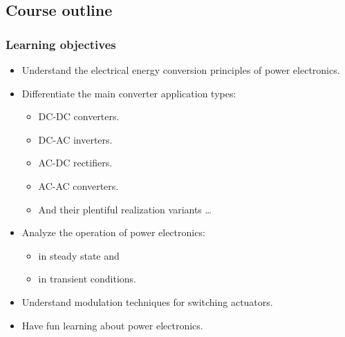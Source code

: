 \subsection{Course outline}

\begin{frame}
	\frametitle{Learning objectives}
	\begin{itemize}
		\item Understand the electrical energy conversion principles of power electronics.
		\item<2-> Differentiate the main converter application types:
		\begin{itemize}
			\item DC-DC converters.
			\item DC-AC inverters.
			\item AC-DC rectifiers.
			\item AC-AC converters.
			\item And their plentiful realization variants \ldots
		\end{itemize}
		\item<3-> Analyze the operation of power electronics:
		\begin{itemize}
			\item in steady state and
			\item in transient conditions.
		\end{itemize} 
		\item<4-> Understand modulation techniques for switching actuators.
		\item<5-> Have fun learning about power electronics.
	\end{itemize}
\end{frame}

